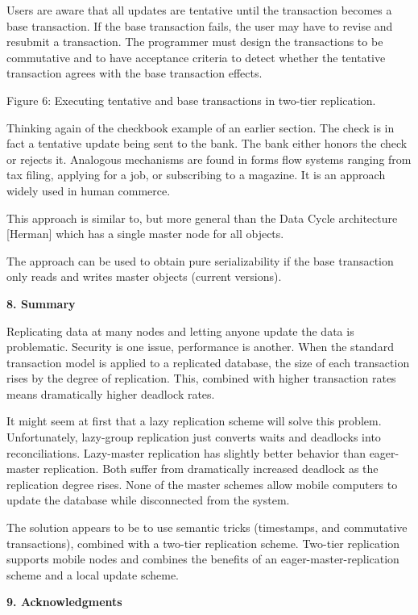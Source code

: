\documentclass[a4paper,12pt,twoside,openright]{article}
\begin{document}
Users are aware that all updates are tentative until the transaction
becomes a base transaction. If the base transaction fails, the user may
have to revise and resubmit a transaction. The programmer must design
the transactions to be commutative and to have acceptance criteria to
detect whether the tentative transaction agrees with the base
transaction effects.

Figure 6: Executing tentative and base transactions in two-tier
replication.

Thinking again of the checkbook example of an earlier section. The check
is in fact a tentative update being sent to the bank. The bank either
honors the check or rejects it. Analogous mechanisms are found in forms
flow systems ranging from tax filing, applying for a job, or subscribing
to a magazine. It is an approach widely used in human commerce.

This approach is similar to, but more general than the Data Cycle
architecture {[}Herman{]} which has a single master node for all
objects.

The approach can be used to obtain pure serializability if the base
transaction only reads and writes master objects (current versions).

\textbf{8. Summary}

Replicating data at many nodes and letting anyone update the data is
problematic. Security is one issue, performance is another. When the
standard transaction model is applied to a replicated database, the size
of each transaction rises by the degree of replication. This, combined
with higher transaction rates means dramatically higher deadlock rates.

It might seem at first that a lazy replication scheme will solve this
problem. Unfortunately, lazy-group replication just converts waits and
deadlocks into reconciliations. Lazy-master replication has slightly
better behavior than eager-master replication. Both suffer from
dramatically increased deadlock as the replication degree rises. None of
the master schemes allow mobile computers to update the database while
disconnected from the system.

The solution appears to be to use semantic tricks (timestamps, and
commutative transactions), combined with a two-tier replication scheme.
Two-tier replication supports mobile nodes and combines the benefits of
an eager-master-replication scheme and a local update scheme.

\textbf{9. Acknowledgments}
\end{document}

